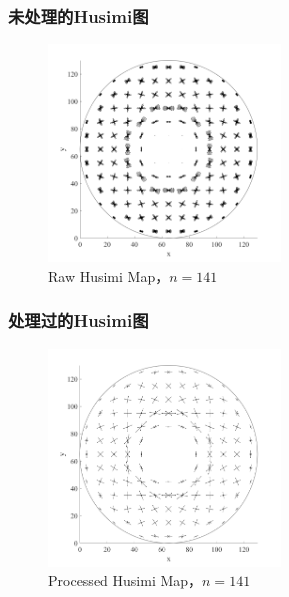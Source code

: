 \documentclass[UTF8]{beamer}
\begin{document}
\begin{frame}
	\frametitle{未处理的Husimi图}
	\begin{figure}
		\centering
		\includegraphics[width = 0.55\textwidth]{../images/figure/141_h_HusimiMap.png}
		\caption{Raw Husimi Map，$n=141$}
	\end{figure}
\end{frame}

\begin{frame}
	\frametitle{处理过的Husimi图}
	\begin{figure}
		\centering
		\includegraphics[width = 0.55\textwidth]{../images/figure/141_h_pHusimiMap.png}
		\caption{Processed Husimi Map，$n=141$}
	\end{figure}
\end{frame}
\end{document}
